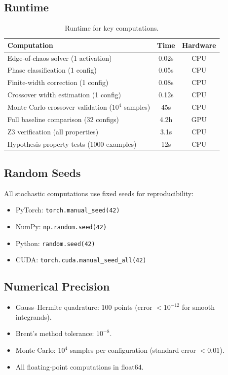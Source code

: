 \documentclass[10pt]{article}
\begin{document}
\subsection{Runtime}

\begin{table}[h]
\centering
\caption{Runtime for key computations.}
\label{tab:runtime}
\small
\begin{tabular}{@{}lcc@{}}
\toprule
\textbf{Computation} & \textbf{Time} & \textbf{Hardware} \\
\midrule
Edge-of-chaos solver (1 activation) & 0.02s & CPU \\
Phase classification (1 config) & 0.05s & CPU \\
Finite-width correction (1 config) & 0.08s & CPU \\
Crossover width estimation (1 config) & 0.12s & CPU \\
Monte Carlo crossover validation ($10^4$ samples) & 45s & CPU \\
Full baseline comparison (32 configs) & 4.2h & GPU \\
Z3 verification (all properties) & 3.1s & CPU \\
Hypothesis property tests (1000 examples) & 12s & CPU \\
\bottomrule
\end{tabular}
\end{table}

\subsection{Random Seeds}

All stochastic computations use fixed seeds for reproducibility:
\begin{itemize}[nosep]
    \item PyTorch: \texttt{torch.manual\_seed(42)}
    \item NumPy: \texttt{np.random.seed(42)}
    \item Python: \texttt{random.seed(42)}
    \item CUDA: \texttt{torch.cuda.manual\_seed\_all(42)}
\end{itemize}

\subsection{Numerical Precision}

\begin{itemize}[nosep]
    \item Gauss--Hermite quadrature: 100 points (error $< 10^{-12}$ for smooth integrands).
    \item Brent's method tolerance: $10^{-8}$.
    \item Monte Carlo: $10^4$ samples per configuration (standard error $< 0.01$).
    \item All floating-point computations in float64.
\end{itemize}
\end{document}
